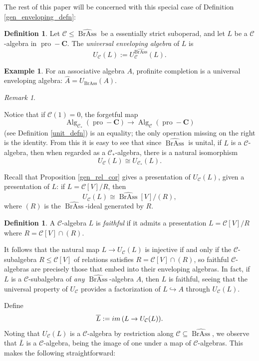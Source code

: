 \documentclass[12pt]{article}
\DeclareMathOperator{\Alg}{Alg}
\DeclareMathOperator{\pro}{pro}
\DeclareMathOperator{\BrAss}{BrAss}
\newcommand{\Ahat}{\widehat{A}}
\newcommand{\BrAsshat}{\widehat{\BrAss}} %
\newcommand{\Lbar}{\overline{L}}
\newcommand{\CC} {\mathcal{C}}
\newcommand{\bC} {\mathbf{C}}
\newcommand{\proC}{\pro\!-\bC}
\newcommand{\im}{{\rm im \,}}
\theoremstyle{plain}
\theoremstyle{definition}
\newtheorem{defn}[thm]{Definition}
\newtheorem{exmp}[thm]{Example}
\theoremstyle{remark}
\newtheorem{rem}[thm]{Remark}
\begin{document}
The rest of this paper will be concerned with this special case of Definition \ref{gen_enveloping_defn}:

\begin{defn}

Let $\CC \leq \BrAsshat$ be a essentially strict suboperad, and let $L$ be a $\CC$-algebra in $\proC$.  The \emph{universal enveloping algebra} of $L$ is
%
$$U_{\CC}(L) := U_{\CC}^{\BrAsshat}(L).$$

\end{defn}


\begin{exmp} For an associative algebra $A$, profinite completion is a universal enveloping algebra: $\Ahat = U_{\BrAss}(A)$. \end{exmp} 

\begin{rem} \label{same_env_alg_rem} 

Notice that if $\CC(1) = 0$, the forgetful map
%
$$\Alg_{\CC_*}(\proC) \longrightarrow \Alg_{\CC}(\proC)$$ 
%
(see Definition \ref{unit_defn}) is an equality; the only operation missing on the right is the identity.  From this it is easy to see that since $\BrAsshat$ is unital, if $L$ is a $\CC$-algebra, then when regarded as a $\CC_*$-algebra, there is a natural isomorphism 
%
$$U_{\CC}(L) \cong U_{\CC_*}(L).$$

\end{rem}


Recall that Proposition \ref{gen_rel_cor} gives a presentation of $U_{\CC}(L)$, given a presentation of $L$: if $L =\CC[V]/R$, then
%
$$U_{\CC}(L) \cong \BrAsshat[V]/(R),$$
%
where $(R)$ is the $\BrAsshat$-ideal generated by $R$.

\begin{defn} A $\CC$-algebra $L$ is \emph{faithful} if it admits a presentation $L = \CC[V]/R$ where $R = \CC[V] \cap (R)$.  \end{defn}

It follows that the natural map $L \to U_{\CC}(L)$ is injective if and only if the $\CC$-subalgebra $R \leq \CC[V]$ of relations satisfies $R = \CC[V] \cap (R)$, so faithful $\CC$-algebras are precisely those that embed into their enveloping algebras.  In fact, if $L$ is a $\CC$-subalgebra of \emph{any} $\BrAsshat$-algebra $A$, then $L$ is faithful, seeing that the universal property of $U_{\CC}$ provides a factorization of $L \hookrightarrow A$ through $U_{\CC}(L)$.

Define
%
$$\Lbar:= \im(L \to U_{\CC}(L)).$$
%
Noting that $U_{\CC}(L)$ is a $\CC$-algebra by restriction along $\CC \subseteq \BrAsshat$, we observe that $\Lbar$ is a $\CC$-algebra, being the image of one under a map of $\CC$-algebras. This makes the following straightforward:
\end{document}
